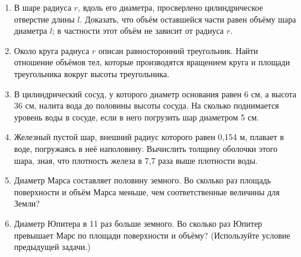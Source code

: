 \begin{enumerate}
\item
В шаре радиуса $r$, вдоль его диаметра, просверлено цилиндрическое отверстие длины $l$.
Доказать, что объём оставшейся части равен объёму шара диаметра $l$; в частности этот объём не зависит от радиуса $r$.

\item
Около круга радиуса $r$ описан равносторонний треугольник.
Найти отношение объёмов тел, которые производятся вращением круга и площади треугольника вокруг высоты треугольника.

\item
В цилиндрический сосуд, у которого диаметр основания равен 6 см, а высота 36 см, налита вода до половины высоты сосуда.
На сколько поднимается уровень воды в сосуде, если в него погрузить шар диаметром 5 см.

\item
Железный пустой шар, внешний радиус которого равен 0,154 м, плавает в воде, погружаясь в неё наполовину.
Вычислить толщину оболочки этого шара, зная, что плотность железа в 7,7 раза выше плотности воды.

\item
Диаметр Марса составляет половину земного.
Во сколько раз площадь поверхности и объём Марса меньше, чем соответственные величины для Земли?

\item
Диаметр Юпитера в 11 раз больше земного.
Во сколько раз Юпитер превышает Марс по площади поверхности и объёму? (Используйте условие предыдущей задачи.)
\end{enumerate}
